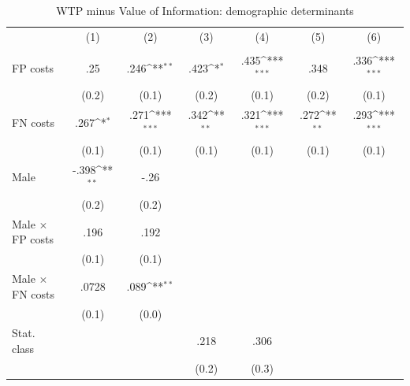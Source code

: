 \begin{table}[htbp]\centering
\def\sym#1{\ifmmode^{#1}\else\(^{#1}\)\fi}
\caption{WTP minus Value of Information: demographic determinants}
\begin{tabular}{l*{6}{c}}
\hline\hline
                &\multicolumn{1}{c}{(1)}&\multicolumn{1}{c}{(2)}&\multicolumn{1}{c}{(3)}&\multicolumn{1}{c}{(4)}&\multicolumn{1}{c}{(5)}&\multicolumn{1}{c}{(6)}\\
                &\multicolumn{1}{c}{}&\multicolumn{1}{c}{}&\multicolumn{1}{c}{}&\multicolumn{1}{c}{}&\multicolumn{1}{c}{}&\multicolumn{1}{c}{}\\
\hline
FP costs        &      .25         &     .246\sym{**} &     .423\sym{*}  &     .435\sym{***}&     .348         &     .336\sym{***}\\
                &    (0.2)         &    (0.1)         &    (0.2)         &    (0.1)         &    (0.2)         &    (0.1)         \\
FN costs        &     .267\sym{*}  &     .271\sym{***}&     .342\sym{**} &     .321\sym{***}&     .272\sym{**} &     .293\sym{***}\\
                &    (0.1)         &    (0.1)         &    (0.1)         &    (0.1)         &    (0.1)         &    (0.1)         \\
Male            &    -.398\sym{**} &     -.26         &                  &                  &                  &                  \\
                &    (0.2)         &    (0.2)         &                  &                  &                  &                  \\
Male $\times$ FP costs&     .196         &     .192         &                  &                  &                  &                  \\
                &    (0.1)         &    (0.1)         &                  &                  &                  &                  \\
Male $\times$ FN costs&    .0728         &     .089\sym{**} &                  &                  &                  &                  \\
                &    (0.1)         &    (0.0)         &                  &                  &                  &                  \\
Stat. class     &                  &                  &     .218         &     .306         &                  &                  \\
                &                  &                  &    (0.2)         &    (0.3)         &                  &                  \\

\end{tabular}
\end{table}
